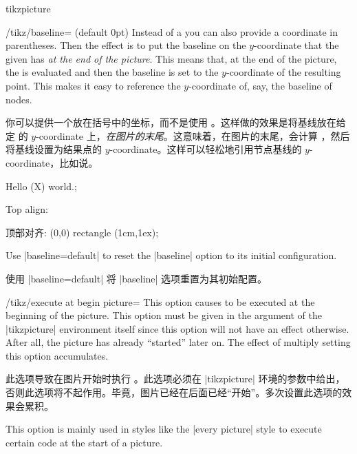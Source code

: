 \begin{environment}{{tikzpicture}}
\begin{key}{/tikz/baseline= (default 0pt)}
      Instead of a  you can also provide a coordinate in
      parentheses. Then the effect is to put the baseline on the
      $y$-coordinate that the given  has \emph{at the end of
      the picture}. This means that, at the end of the picture, the
       is evaluated and then the baseline is set to the
      $y$-coordinate of the resulting point. This makes it easy to reference
      the $y$-coordinate of, say, the baseline of nodes.
      
      你可以提供一个放在括号中的坐标，而不是使用 。这样做的效果是将基线放在给定  的 $y$-coordinate 上，\emph{在图片的末尾}。这意味着，在图片的末尾，会计算 ，然后将基线设置为结果点的 $y$-coordinate。这样可以轻松地引用节点基线的 $y$-coordinate，比如说。

\begin{codeexample}[preamble={\usetikzlibrary{shapes.misc}}]
Hello
\tikz[baseline=(X.base)]
 (X) {world.};
\end{codeexample}

\begin{codeexample}[]
Top align:

顶部对齐:
\tikz[baseline=(current bounding box.north)]
\draw (0,0) rectangle (1cm,1ex);
\end{codeexample}

      Use |baseline=default| to reset the |baseline| option to its initial
      configuration.

      使用 |baseline=default| 将 |baseline| 选项重置为其初始配置。
  \end{key}

  \begin{key}{/tikz/execute at begin picture=}
      This option causes  to be executed at the beginning of the
      picture. This option must be given in the argument of the
      |{tikzpicture}| environment itself since this option will not have an
      effect otherwise. After all, the picture has already ``started'' later
      on. The effect of multiply setting this option accumulates.

      此选项导致在图片开始时执行 。此选项必须在 |{tikzpicture}| 环境的参数中给出，否则此选项将不起作用。毕竟，图片已经在后面已经“开始”。多次设置此选项的效果会累积。

      This option is mainly used in styles like the |every picture| style to
      execute certain code at the start  of a picture.


\end{key}
\end{environment}
